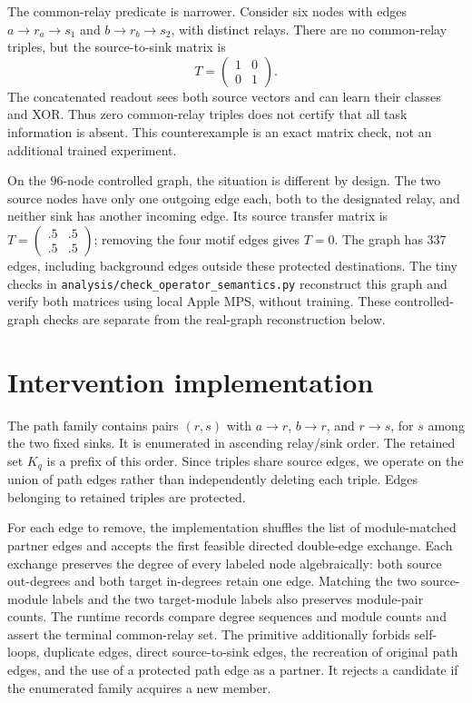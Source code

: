 \documentclass[10pt,letterpaper]{article}
\begin{document}
The common-relay predicate is narrower. Consider six nodes with edges
$a\to r_a\to s_1$ and $b\to r_b\to s_2$, with distinct relays. There
are no common-relay triples, but the source-to-sink matrix is
\[
 T=\begin{pmatrix}1&0\\0&1\end{pmatrix}.
\]
The concatenated readout sees both source vectors and can learn their
classes and XOR. Thus zero common-relay triples does not certify that
all task information is absent. This counterexample is an exact matrix
check, not an additional trained experiment.

On the 96-node controlled graph, the situation is different by design.
The two source nodes have only one outgoing edge each, both to the
designated relay, and neither sink has another incoming edge. Its source
transfer matrix is
$T=\left(\begin{smallmatrix}.5&.5\\.5&.5\end{smallmatrix}\right)$;
removing the four motif edges gives $T=0$. The graph has 337 edges,
including background edges outside these protected destinations. The
tiny checks in \texttt{analysis/check\_operator\_semantics.py} reconstruct
this graph and verify both matrices using local Apple MPS, without
training. These controlled-graph checks are separate from the real-graph reconstruction below.

\section{Intervention implementation}

The path family contains pairs $(r,s)$ with
$a\to r$, $b\to r$, and $r\to s$, for $s$ among the two fixed sinks.
It is enumerated in ascending relay/sink order. The retained set $K_q$
is a prefix of this order. Since triples share source edges, we operate
on the union of path edges rather than independently deleting each
triple. Edges belonging to retained triples are protected.

For each edge to remove, the implementation shuffles the list of
module-matched partner edges and accepts the first feasible directed
double-edge exchange. Each exchange preserves the degree of every
labeled node algebraically: both source out-degrees and both target
in-degrees retain one edge. Matching the two source-module labels and
the two target-module labels also preserves module-pair counts. The
runtime records compare degree sequences and module counts and assert
the terminal common-relay set. The primitive additionally forbids
self-loops, duplicate edges, direct source-to-sink edges, the recreation
of original path edges, and the use of a protected path edge as a partner.
It rejects a candidate if the enumerated family acquires a new member.
\end{document}
